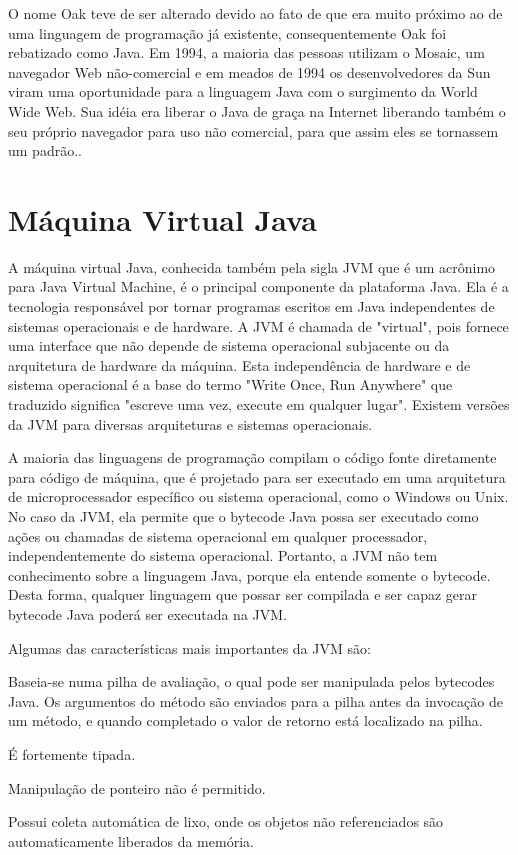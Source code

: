   O nome Oak teve de ser alterado devido ao fato de que era muito próximo ao de uma linguagem de programação já existente, consequentemente Oak foi rebatizado como Java. Em 1994, a maioria das pessoas utilizam o Mosaic, um navegador Web não-comercial e em meados de 1994 os desenvolvedores da Sun viram uma oportunidade para a linguagem Java com o surgimento da World Wide Web. Sua idéia era liberar o Java de graça na Internet liberando também o seu próprio navegador para uso não comercial, para que assim eles se tornassem um padrão.\cite{CoreJava:2010}.

\section{Máquina Virtual Java}

  A máquina virtual Java, conhecida também pela sigla \ac{JVM} que é um acrônimo para Java Virtual Machine, é o principal componente da plataforma Java. Ela é a tecnologia responsável por tornar programas escritos em Java independentes de sistemas operacionais e de hardware. A \ac{JVM} é chamada de "virtual", pois fornece uma interface que não depende de sistema operacional subjacente ou da arquitetura de hardware da máquina. Esta independência de hardware e de sistema operacional é a base do termo "Write Once, Run Anywhere" que traduzido significa "escreve uma vez, execute em qualquer lugar"\cite{jvm:2013}. Existem versões da \ac{JVM} para diversas arquiteturas e sistemas operacionais.

  A maioria das linguagens de programação compilam o código fonte diretamente para código de máquina, que é projetado para ser executado em uma arquitetura de microprocessador específico ou sistema operacional, como o Windows ou Unix. No caso da \ac{JVM}, ela permite que o bytecode Java possa ser executado como ações ou chamadas de sistema operacional em qualquer processador, independentemente do sistema operacional. Portanto, a \ac{JVM} não tem conhecimento sobre a linguagem Java, porque ela entende somente o bytecode. Desta forma, qualquer linguagem que possar ser compilada e ser capaz gerar bytecode Java poderá ser executada na \ac{JVM}.

  Algumas das características mais importantes da \ac{JVM} são:

  \begin{compactitem}
    \item Baseia-se numa pilha de avaliação, o qual pode ser manipulada pelos bytecodes Java. Os argumentos do método são enviados para a pilha antes da invocação de um método, e quando completado o valor de retorno está localizado na pilha.
    \item É fortemente tipada.
    \item Manipulação de ponteiro não é permitido.
    \item Possui coleta automática de lixo, onde os objetos não referenciados são automaticamente liberados da memória.
  \end{compactitem}

